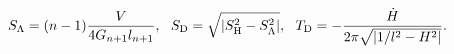 \begin{equation}
\label{2eq9}
S_{\rm \Lambda}=(n-1) \frac{V}{4 G_{n+1}l_{n+1}}, ~~
S_{\rm D} =\sqrt{|S^2_{\rm H}-S^2_{\rm \Lambda}|}
,~~T_{\rm D}=- \frac{ \dot H} { 2 \pi \sqrt{|1/l^2-H^2|}}.
\end{equation}

